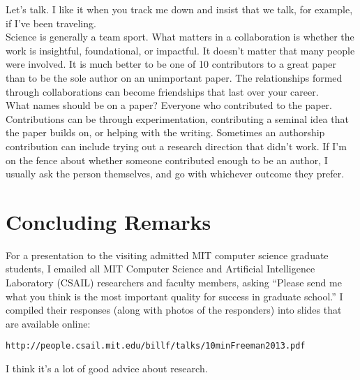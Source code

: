   Let's talk.  I
  like it when you track me down and insist that we talk, for example,  if I've been traveling. \\
  

  Science is generally a team sport.   What matters in a collaboration is whether the work is insightful,  foundational, or impactful.  It doesn't matter that many people were involved.
It is much better to be one of 10 contributors to a great paper than to be the sole author on an unimportant paper. The relationships formed through collaborations can become friendships that last over your career. \\

  What names should be on a paper? Everyone who contributed to the paper.  Contributions can be through experimentation, contributing a seminal idea that the paper builds on, or helping with the writing.  Sometimes an authorship contribution can include trying out a research direction that didn't work. If I'm on the fence about whether someone contributed enough to be an author, I usually ask the person themselves, and go with whichever outcome they prefer. 


\section{Concluding Remarks}  


For a presentation to the visiting admitted MIT computer science graduate students, I
  emailed all MIT Computer Science and Artificial Intelligence Laboratory (CSAIL) researchers and faculty members, asking ``Please send me   what you think is   the most important  quality for success in graduate school.''   I compiled their responses (along with photos of the responders) into slides that are available online:  
\begin{verbatim}
http://people.csail.mit.edu/billf/talks/10minFreeman2013.pdf
\end{verbatim}
I think it's a lot of good advice about research. 










